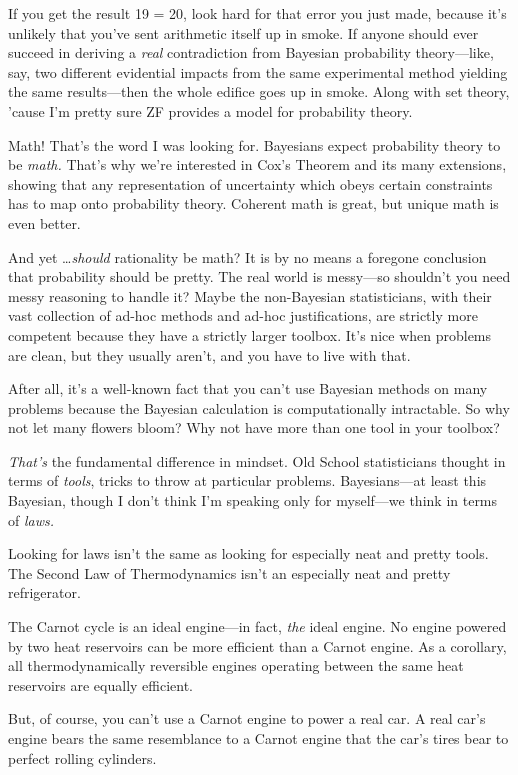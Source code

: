 {
 If you get the result 19 = 20, look hard for that error you just
made, because it's unlikely that you've
sent arithmetic itself up in smoke. If anyone should ever succeed in
deriving a \textit{real} contradiction from Bayesian probability
theory---like, say, two different evidential impacts from the same
experimental method yielding the same results---then the whole edifice
goes up in smoke. Along with set theory, 'cause
I'm pretty sure ZF provides a model for probability
theory.}

{
 Math! That's the word I was looking for. Bayesians
expect probability theory to be \textit{math.} That's
why we're interested in Cox's Theorem
and its many extensions, showing that any representation of uncertainty
which obeys certain constraints has to map onto probability theory.
Coherent math is great, but unique math is even better.}

{
 And yet \ldots \textit{should} rationality be math? It is by no
means a foregone conclusion that probability should be pretty. The real
world is messy---so shouldn't you need messy reasoning
to handle it? Maybe the non-Bayesian statisticians, with their vast
collection of ad-hoc methods and ad-hoc justifications, are strictly
more competent because they have a strictly larger toolbox.
It's nice when problems are clean, but they usually
aren't, and you have to live with that.}

{
 After all, it's a well-known fact that you
can't use Bayesian methods on many problems because the
Bayesian calculation is computationally intractable. So why not let
many flowers bloom? Why not have more than one tool in your toolbox?}

{
 \textit{That's} the fundamental difference in
mindset. Old School statisticians thought in terms of \textit{tools},
tricks to throw at particular problems. Bayesians---at least this
Bayesian, though I don't think I'm
speaking only for myself---we think in terms of \textit{laws.}}

{
 Looking for laws isn't the same as looking for
especially neat and pretty tools. The Second Law of Thermodynamics
isn't an especially neat and pretty refrigerator.}

{
 The Carnot cycle is an ideal engine---in fact, \textit{the} ideal
engine. No engine powered by two heat reservoirs can be more efficient
than a Carnot engine. As a corollary, all thermodynamically reversible
engines operating between the same heat reservoirs are equally
efficient.}

{
 But, of course, you can't use a Carnot engine to
power a real car. A real car's engine bears the same
resemblance to a Carnot engine that the car's tires
bear to perfect rolling cylinders.}

